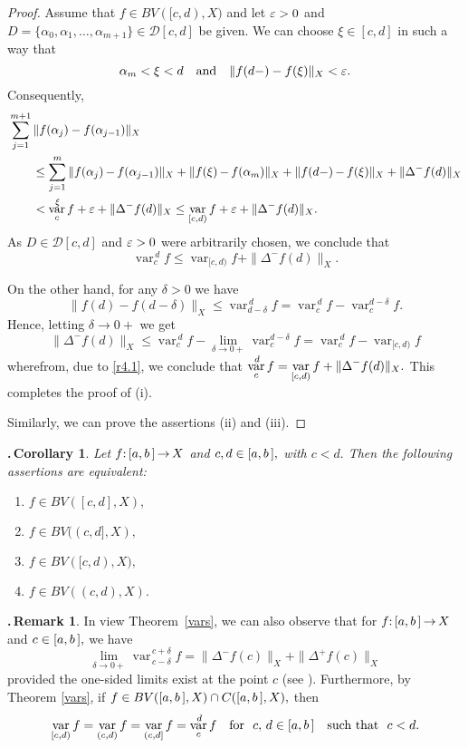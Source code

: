 \documentclass[12pt,twoside]{article}
\numberwithin{equation}{section}
\theoremstyle{plain}
\newtheorem{corollary}[theorem]{\hskip-1mm.\,Corollary}
\theoremstyle{definition}
\newtheorem{remark}[theorem]{\hskip-1mm.\,Remark}
\DeclareMathOperator{\var}{var}
\begin{document}
{\begin{proof}
\smallskip

Assume that $f\in BV([c,d),X)$ and let $\varepsilon>0$ and
$D=\{\alpha_0,\alpha_1,\dots,\alpha_{m+1}\}\in\mathcal D[c,d]$ be given.
We can choose $\xi\in[c,d]$ in such a way that
\[
   \alpha_m<\xi<d \quad\mbox{and}\quad \|f(d-)-f(\xi)\|_X<\varepsilon.
\]
Consequently,
\begin{align*}
    &\sum_{j=1}^{m{+}1}\|f(\alpha_j)-f(\alpha_{j-1})\|_X
   \\
    &\qquad
     \le\sum_{j=1}^{m}\|f(\alpha_j)\,{-}\,f(\alpha_{j-1})\|_X+\|f(\xi)\,{-}\,f(\alpha_m)\|_X
     +\|f(d-)\,{-}\,f(\xi)\|_X+\|\Delta^-f(d)\|_X
   \\
    &\qquad<\var_c^{\,\xi}f+\eps+\|\Delta^-f(d)\|_X
     \le\var_{[c,d)}f+\eps+\|\Delta^-f(d)\|_X.
\end{align*}
As $D\in\mathcal D[c,d]$ and $\varepsilon>0$ were arbitrarily chosen, we conclude that
\begin{equation}\label{r4.1}
   \var_c^{\,d} f\le\var_{[c,d)}f+\|\Delta^-f(d)\|_X.
\end{equation}

On the other hand, for any $\delta>0$ we have
\[
   \|f(d)-f(d-\delta)\|_X\le\var_{d-\delta}^{\,d} f=\var_c^{\,d}f-\var_c^{d-\delta}f.
\]
Hence, letting $\delta\to 0+$ we get
\[
   \|\Delta^-f(d)\|_X
   \le\var_c^{\,d}f-\lim_{\delta\to 0+}\var_c^{d-\delta}f=\var_c^{\,d}f-\var_{[c,d)}f
\]
wherefrom, due to \eqref{r4.1}, we conclude that
$\dis\var_c^{\,d}f=\var_{[c,d)}f+\|\Delta^-f(d)\|_X.$ This completes the proof of (i).

\smallskip

Similarly, we can prove the assertions (ii) and (iii).
\end{proof}

\smallskip

\begin{corollary}\label{C4.5}
Let $f{:}\,[a,b\,]\,{\to}\,X$ and $c,d\in[a,b\,],$ with $c<d.$ Then the following assertions
are equivalent:
\begin{enumerate}[{\rm(i)}]
  \item  $f\in BV([c,d],X),$
  \item  $f\in BV((c,d],X),$
  \item  $f\in BV([c,d),X),$
  \item  $f\in BV((c,d),X).$
\end{enumerate}
\end{corollary}

\smallskip

\begin{remark}\label{P4.5}
In view Theorem~\ref{vars}, we can also observe that for $f{:}\,[a,b\,]\,{\to}\,X$ and $c\in[a,b\,],$
we have
\[
   \lim_{\delta\to 0+}\var_{\,c{-}\delta}^{\,c{+}\delta}f=\|\Delta^-f(c)\|_X+\|\Delta^+f(c)\|_X
\]
provided the one-sided limits exist at the point $c$ (see \cite[Proposition I.2.8]{H1}).
Furthermore, by Theorem \ref{vars}, if $f\in BV([a,b\,],X)\cap C([a,b\,],X),$ then
\[
   \var_{[c,d)}f=\var_{(c,d)}f=\var_{(c,d]}f=\var_c^{\,d}f
   \quad\mbox{for \ } c,\,d\in\ab \quad\mbox{such that \ } c<d.
\]
\end{remark}

}
\end{document}
